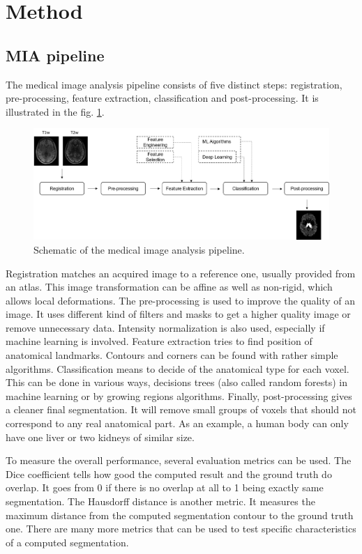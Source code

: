 \section*{Method}

\subsection*{MIA pipeline} \label{sec:MIApipeline}
The medical image analysis pipeline consists of five distinct steps: registration, pre-processing, feature extraction, classification and post-processing. It is illustrated in the fig. \ref{fig:pipeline}.

\begin{figure}[h!]
	\centering
	\includegraphics[width = .45 \textwidth]{img/pipeline}
	\caption{Schematic of the medical image analysis pipeline.}
	\label{fig:pipeline}
\end{figure}

Registration matches an acquired image to a reference one, usually provided from an atlas. This image transformation can be affine as well as non-rigid, which allows local deformations. The pre-processing is used to improve the quality of an image. It uses different kind of filters and masks to get a higher quality image or remove unnecessary data. Intensity normalization is also used, especially if machine learning is involved. Feature extraction tries to find position of anatomical landmarks. Contours and corners can be found with rather simple algorithms. Classification means to decide of the anatomical type for each voxel. This can be done in various ways, decisions trees (also called random forests) in machine learning or by growing regions algorithms. Finally, post-processing gives a cleaner final segmentation. It will remove small groups of voxels that should not correspond to any real anatomical part. As an example, a human body can only have one liver or two kidneys of similar size.

To measure the overall performance, several evaluation metrics can be used. The Dice coefficient tells how good the computed result and the ground truth do overlap. It goes from 0 if there is no overlap at all to 1 being exactly same segmentation. The Hausdorff distance is another metric. It measures the maximum distance from the computed segmentation contour to the ground truth one. There are many more metrics that can be used to test specific characteristics of a computed segmentation.

